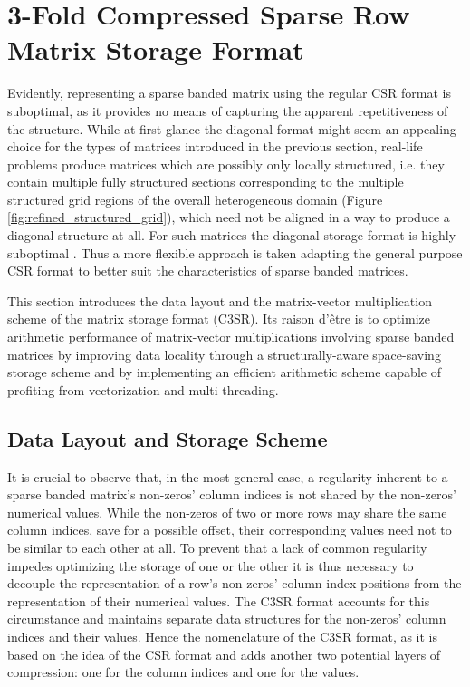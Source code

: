 \chapter{3-Fold Compressed Sparse Row Matrix Storage Format}

  Evidently, representing a sparse banded matrix using the regular CSR format is suboptimal, as it provides no means of
  capturing the apparent repetitiveness of the structure. While at first glance the diagonal format might seem an
  appealing choice for the types of matrices introduced in the previous section, real-life problems produce matrices
  which are possibly only locally structured, i.e. they contain multiple fully structured sections corresponding to the
  multiple structured grid regions of the overall heterogeneous domain (Figure \ref{fig:refined_structured_grid}), which
  need not be aligned in a way to produce a diagonal structure at all. For such matrices the diagonal storage format is
  highly suboptimal \cite{Bell2011}. Thus a more flexible approach is taken adapting the general purpose CSR format to
  better suit the characteristics of sparse banded matrices.

  This section introduces the data layout and the matrix-vector multiplication scheme of the  matrix storage format (C3SR). Its raison d'être is to optimize arithmetic performance of matrix-vector
  multiplications involving sparse banded matrices by improving data locality through a structurally-aware space-saving
  storage scheme and by implementing an efficient arithmetic scheme capable of profiting from vectorization and
  multi-threading.

  \section{Data Layout and Storage Scheme}


    It is crucial to observe that, in the most general case, a regularity inherent to a sparse banded matrix's
    non-zeros' column indices is not shared by the non-zeros' numerical values. While the non-zeros of two or more rows
    may share the same column indices, save for a possible offset, their corresponding values need not to be similar to
    each other at all. To prevent that a lack of common regularity impedes optimizing the storage of one or the other it
    is thus necessary to decouple the representation of a row's non-zeros' column index positions from the
    representation of their numerical values. The C3SR format accounts for this circumstance and maintains separate data
    structures for the non-zeros' column indices and their values. Hence the nomenclature of the C3SR format, as it is
    based on the idea of the CSR format and adds another two potential layers of compression: one for the column indices
    and one for the values.

